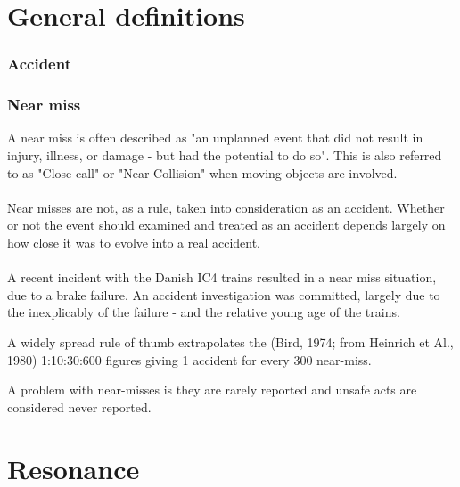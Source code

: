 \section{General definitions}

\subsubsection*{Accident}

\subsubsection*{Near miss}
A near miss is often described as "an unplanned event that did not result in injury, illness, or damage - but had the potential to do so". This is also referred to as "Close call" or "Near Collision" when moving objects are involved.\\
\\
Near misses are not, as a rule, taken into consideration as an accident. Whether or not the event should examined and treated as an accident depends largely on how close it was to evolve into a real accident.\\
\\
A recent incident with the Danish IC4 trains resulted in a near miss situation, due to a brake failure. An accident investigation was committed, largely due to the inexplicably of the failure - and the relative young age of the trains.

A widely spread rule of thumb extrapolates the (Bird, 1974; from Heinrich et Al., 1980) 1:10:30:600 figures giving 1 accident for every 300 near-miss.

A problem with near-misses is they are rarely reported and unsafe acts are considered never reported.

\section{Resonance}

